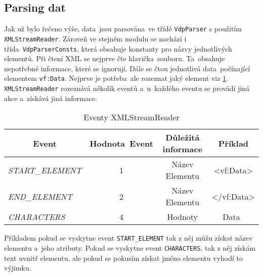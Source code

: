 \subsection{Parsing dat}
Jak už bylo řečeno výše, data~jsou parsována~ve třídě \texttt{VdpParser} s použitím \\ \texttt{XMLStreamReader}.
Zároveň ve stejném modulu se nachází i třída~\texttt{VdpParserConsts}, která obsahuje konstanty pro názvy jednotlivých elementů.
Při čtení XML se nejprve čte hlavička~souboru. Ta~obsahuje nepotřebné informace, které se ignorují.
Dále se čtou jednotlivá data~počínající elementem \texttt{vf:Data}.
Nejprve je potřeba~ale rozeznat jaký element viz \ref{tab:xmlStreamReader}.
\texttt{XMLStreamReader} rozeznává několik eventů a~u~každého eventu se provádí jiná akce a~získává jiná informace.
\begin{table}[!h]
    \label{tab:xmlStreamReader}
    \centering
    \caption{Eventy XMLStreamReader}
    \begin{tabular}{|l|c|c|c|}
    \hline
    \multicolumn{1}{|c|}{\textbf{Event}} & \textbf{Hodnota~Event} & \textbf{Důležitá informace} & \textbf{Příklad}                                 \\ \hline
    \textit{START\_ELEMENT}              & 1                      & Název Elementu              & \textless{}vf:Data\textgreater{}                 \\ \hline
    \textit{END\_ELEMENT}                & 2                      & Název Elementu              & \textless{}/vf:Data\textgreater{} \\ \hline
    \textit{CHARACTERS}                  & 4                      & Hodnoty                     & Data~                                            \\ \hline
    \end{tabular}
\end{table}

Příkladem pokud se vyskytne event \texttt{START\_ELEMENT} tak z něj můžu získat název elementu a~jeho atributy.
Pokud se vyskytne event \texttt{CHARACTERS}, tak z něj získám text uvnitř elementu, ale pokud se pokusím získat jméno elementu vyhodí to výjimku.

